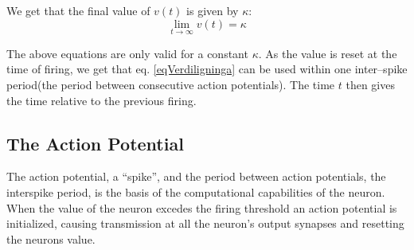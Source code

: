 
We get that the final value of $v(t)$ is given by $\kappa$: 
\begin{equation}
	\lim_{t\to\infty} v(t) = \kappa
	\label{eqKappaSomFinalValueAvV}
\end{equation}

The above equations are only valid for a constant $\kappa$. 
As the value is reset at the time of firing, we get that eq. \eqref{eqVerdiligninga} can be used within one inter--spike period(the period between consecutive action potentials).
The time $t$ then gives the time relative to the previous firing.





\subsection{The Action Potential}
The action potential, a ``spike'', and the period between action potentials, the interspike period, is the basis of the computational capabilities of the neuron.
When the value of the neuron excedes the firing threshold an action potential is initialized, causing transmission at all the neuron's output synapses and resetting the neurons value.

